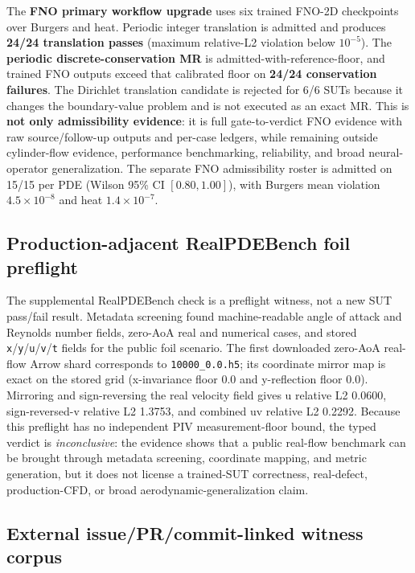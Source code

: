 \documentclass[preprint,12pt]{elsarticle}
\begin{document}
The \textbf{FNO primary workflow upgrade} uses six trained FNO-2D checkpoints over Burgers and heat. Periodic integer translation is admitted and produces \textbf{24/24 translation passes} (maximum relative-L2 violation below $10^{-5}$). The \textbf{periodic discrete-conservation MR} is admitted-with-reference-floor, and trained FNO outputs exceed that calibrated floor on \textbf{24/24 conservation failures}. The Dirichlet translation candidate is rejected for 6/6 SUTs because it changes the boundary-value problem and is not executed as an exact MR. This is \textbf{not only admissibility evidence}: it is full gate-to-verdict FNO evidence with raw source/follow-up outputs and per-case ledgers, while remaining outside cylinder-flow evidence, performance benchmarking, reliability, and broad neural-operator generalization. The separate FNO admissibility roster is admitted on 15/15 per PDE (Wilson 95\% CI $[0.80, 1.00]$), with Burgers mean violation $4.5\times10^{-8}$ and heat $1.4\times10^{-7}$.

\subsection{Production-adjacent RealPDEBench foil preflight}
\label{subsec:realpdebench-foil-preflight}

The supplemental RealPDEBench check is a preflight witness, not a new SUT
pass/fail result. Metadata screening found machine-readable angle of attack and
Reynolds number fields, zero-AoA real and numerical cases, and stored
\texttt{x}/\texttt{y}/\texttt{u}/\texttt{v}/\texttt{t} fields for the public
foil scenario. The first downloaded zero-AoA real-flow Arrow shard corresponds
to \texttt{10000\_0.0.h5}; its coordinate mirror map is exact on the stored grid
(x-invariance floor 0.0 and y-reflection floor 0.0). Mirroring and
sign-reversing the real velocity field gives u relative L2 0.0600,
sign-reversed-v relative L2 1.3753, and combined uv relative L2 0.2292. Because
this preflight has no independent PIV measurement-floor bound, the typed verdict
is \emph{inconclusive}: the evidence shows that a public real-flow benchmark can
be brought through metadata screening, coordinate mapping, and metric generation,
but it does not license a trained-SUT correctness, real-defect, production-CFD,
or broad aerodynamic-generalization claim.

\subsection{External issue/PR/commit-linked witness corpus}
\label{subsec:external-defect-witness-corpus}
\end{document}
